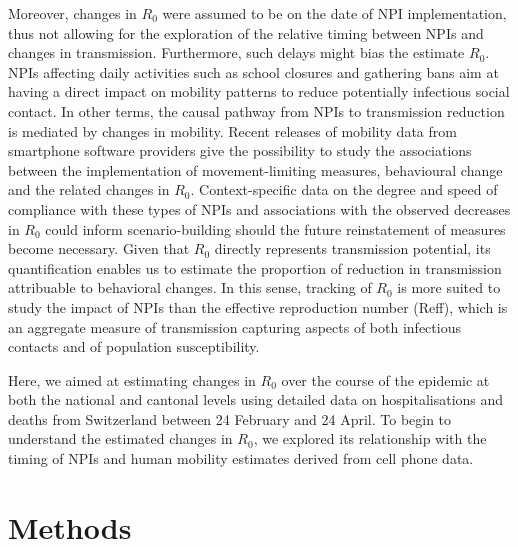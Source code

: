 Moreover, changes in $R_0$ were assumed to be on the date of NPI implementation, thus not allowing for the exploration of the relative timing between NPIs and changes in transmission. Furthermore, such delays might bias the estimate $R_0$. NPIs affecting daily activities such as school closures and gathering bans aim at having a direct impact on mobility patterns to reduce potentially infectious social contact. In other terms, the causal pathway from NPIs to transmission reduction is mediated by changes in mobility. Recent releases of mobility data from smartphone software providers give the possibility to study the associations between the implementation of movement-limiting measures, behavioural change and the related changes in $R_0$. Context-specific data on the degree and speed of compliance with these types of NPIs and associations with the observed decreases in $R_0$ could inform scenario-building should the future reinstatement of measures become necessary. Given that $R_0$ directly represents transmission potential, its quantification enables us to estimate the proportion of reduction in transmission attribuable to behavioral changes. In this sense, tracking of $R_0$ is more suited to study the impact of NPIs than the effective reproduction number (Reff), which is an aggregate measure of transmission capturing aspects of both infectious contacts and of population susceptibility. 

Here, we aimed at estimating changes in $R_0$ over the course of the epidemic at both the national and cantonal levels using detailed data on hospitalisations and deaths from Switzerland between 24 February and 24 April. To begin to understand the estimated changes in $R_0$, we explored its relationship with the timing of NPIs and human mobility estimates derived from cell phone data.

\section{Methods}
